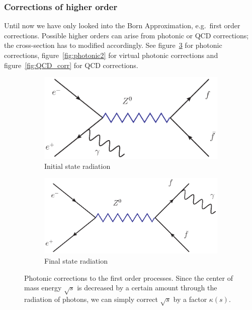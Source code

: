 \subsubsection{Corrections of higher order}
\label{ssub:Corrections_of_higher_order}
Until now we have only looked into the Born Approximation, e.g.\ first order corrections. Possible higher orders can arise
from photonic or QCD corrections; the cross-section has to modified accordingly. See figure~\ref{fig:photonic} for
photonic corrections, figure~\ref{fig:photonic2} for virtual photonic corrections and figure~\ref{fig:QCD_corr} for QCD
corrections.

\begin{figure}[htpb]
\centering
\begin{subfigure}{.5\textwidth}
  \centering
  \includegraphics[width=1.0\linewidth]{figures/corr1}
  \caption{Initial state radiation}
  \label{fig:sub1}
\end{subfigure}%
\begin{subfigure}{.5\textwidth}
  \centering
  \includegraphics[width=1.0\linewidth]{figures/corr2}
  \caption{Final state radiation}
  \label{fig:sub2}
\end{subfigure}
\caption{Photonic corrections to the first order processes. Since the center of mass energy $\sqrt{s}$ is decreased 
by a certain amount through the radiation of photons, we can simply correct $\sqrt{s}$ by a factor $\kappa(s)$. }
\label{fig:photonic}
\end{figure}

